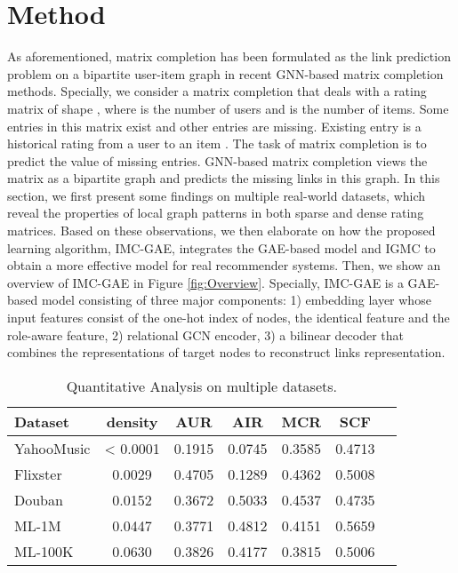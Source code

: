 \documentclass[sigconf]{acmart}
\begin{document}
\section{Method}
As aforementioned, matrix completion has been formulated as the link prediction problem on a bipartite user-item graph in recent GNN-based matrix completion methods. 
Specially, we consider a matrix completion that deals with a rating matrix  of shape , where  is the number of users and  is the number of items. Some entries in this matrix exist and other entries are missing. Existing entry  is a historical rating from a user  to an item . 
The task of matrix completion is to predict the value of missing entries. 
GNN-based matrix completion views the matrix as a bipartite graph and predicts the missing links in this graph.
In this section, we first present some findings on multiple real-world datasets, which reveal the properties of local graph patterns in both sparse and dense rating matrices. 
Based on these observations, we then elaborate on how the proposed learning algorithm, IMC-GAE, integrates the GAE-based model and IGMC to obtain a more effective model for real recommender systems. Then, we show an overview of IMC-GAE in Figure \ref{fig:Overview}. Specially, IMC-GAE is a GAE-based model consisting of three major components:  1) embedding layer whose input features consist of the one-hot index of nodes, the identical feature and the role-aware feature, 2) relational GCN encoder, 3) a bilinear decoder that combines the representations of target nodes to reconstruct links representation. 
\begin{table}
  \caption{Quantitative Analysis on multiple datasets.}
  \label{tab:QAD}
  \begin{tabular}{lcccccc}
    \toprule
    \textbf{Dataset} & \textbf{density} &\textbf{AUR}&\textbf{AIR}&\textbf{MCR}&\textbf{SCF} \\
    \midrule
    YahooMusic & < 0.0001 & 0.1915 & 0.0745 & 0.3585 & 0.4713\\
    Flixster & 0.0029 & 0.4705 & 0.1289 & 0.4362 & 0.5008\\
    Douban & 0.0152 & 0.3672 & 0.5033 & 0.4537 &  0.4735\\
    ML-1M & 0.0447 & 0.3771 & 0.4812 & 0.4151 &  0.5659\\
    ML-100K & 0.0630 & 0.3826 & 0.4177 & 0.3815 & 0.5006\\
  \bottomrule
\end{tabular}
\end{table}
\end{document}
